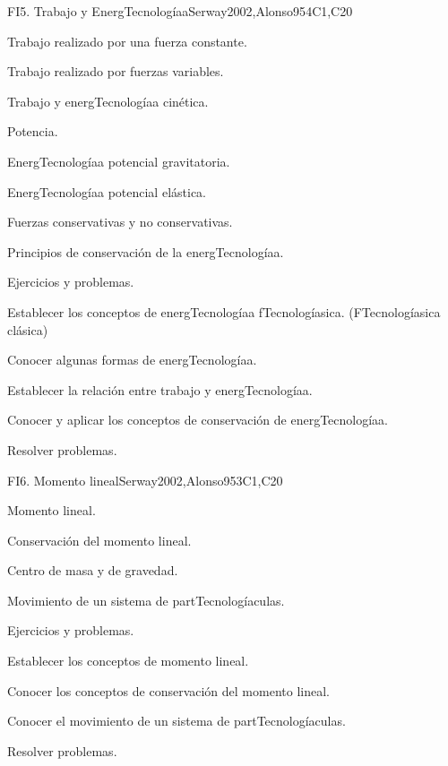 \begin{syllabus}
\begin{unit}{FI5. Trabajo y EnergTecnologíaa}{}{Serway2002,Alonso95}{4}{C1,C20}
\begin{topics}
	\item Trabajo realizado por una fuerza constante.
	\item Trabajo realizado por fuerzas variables.
	\item Trabajo y energTecnologíaa cinética.
	\item Potencia.
	\item EnergTecnologíaa potencial gravitatoria.
	\item EnergTecnologíaa potencial elástica.
	\item Fuerzas conservativas y no conservativas.
	\item Principios de conservación de la energTecnologíaa.
	\item Ejercicios y problemas.
\end{topics}

   \begin{learningoutcomes}
      \item Establecer los conceptos de energTecnologíaa fTecnologíasica. (FTecnologíasica clásica)
      \item Conocer algunas formas de energTecnologíaa.
      \item Establecer la relación entre trabajo y energTecnologíaa.
      \item Conocer y aplicar los conceptos de conservación de energTecnologíaa.
      \item Resolver problemas.
   \end{learningoutcomes}
\end{unit}

\begin{unit}{FI6. Momento lineal}{}{Serway2002,Alonso95}{3}{C1,C20}
\begin{topics}
      \item Momento lineal.
      \item Conservación del momento lineal.
      \item Centro de masa y de gravedad.
      \item Movimiento de un sistema de partTecnologíaculas.
      \item Ejercicios y problemas.
  \end{topics}

   \begin{learningoutcomes}
      \item Establecer los conceptos de momento lineal.
      \item Conocer los conceptos de conservación del momento lineal.
      \item Conocer el movimiento de un sistema de partTecnologíaculas.
      \item Resolver problemas.
   \end{learningoutcomes}
\end{unit}


\end{syllabus}
